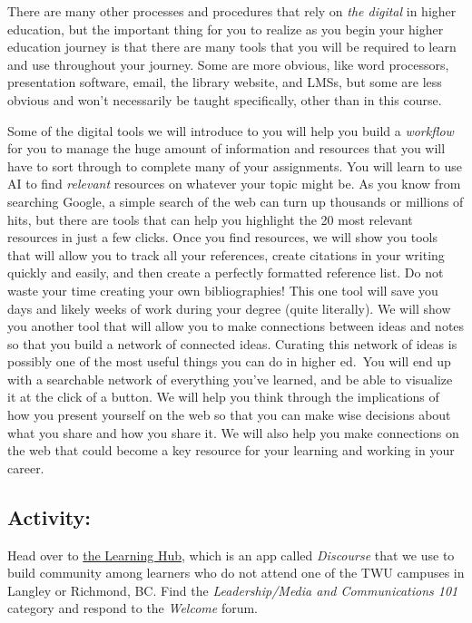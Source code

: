 \documentclass[
]{book}
\theoremstyle{definition}
\theoremstyle{definition}
\theoremstyle{definition}
\theoremstyle{definition}
\theoremstyle{remark}
\begin{document}
There are many other processes and procedures that rely on \emph{the digital} in higher education, but the important thing for you to realize as you begin your higher education journey is that there are many tools that you will be required to learn and use throughout your journey. Some are more obvious, like word processors, presentation software, email, the library website, and LMSs, but some are less obvious and won't necessarily be taught specifically, other than in this course.

Some of the digital tools we will introduce to you will help you build a \emph{workflow} for you to manage the huge amount of information and resources that you will have to sort through to complete many of your assignments. You will learn to use AI to find \emph{relevant} resources on whatever your topic might be. As you know from searching Google, a simple search of the web can turn up thousands or millions of hits, but there are tools that can help you highlight the 20 most relevant resources in just a few clicks. Once you find resources, we will show you tools that will allow you to track all your references, create citations in your writing quickly and easily, and then create a perfectly formatted reference list. Do not waste your time creating your own bibliographies! This one tool will save you days and likely weeks of work during your degree (quite literally). We will show you another tool that will allow you to make connections between ideas and notes so that you build a network of connected ideas. Curating this network of ideas is possibly one of the most useful things you can do in higher ed.~You will end up with a searchable network of everything you've learned, and be able to visualize it at the click of a button. We will help you think through the implications of how you present yourself on the web so that you can make wise decisions about what you share and how you share it. We will also help you make connections on the web that could become a key resource for your learning and working in your career.

\hypertarget{activity}{%
\subsection*{Activity:}\label{activity}}

\begin{reflect}
Head over to \href{https://twu.discourse.group}{the Learning Hub}, which is an app called \emph{Discourse} that we use to build community among learners who do not attend one of the TWU campuses in Langley or Richmond, BC. Find the \emph{Leadership/Media and Communications 101} category and respond to the \emph{Welcome} forum.
\end{reflect}
\end{document}
